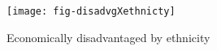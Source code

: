 \documentclass[11pt,letterpaper]{article}
\author{Christopher K. Butler}
\title{}
\begin{document}


\begin{figure}
\caption{Economically disadvantaged by ethnicity}
\label{fig:disadvgXethnicty}
\centering
\texttt{[image: fig-disadvgXethnicty]}
\end{figure}
\end{document}
